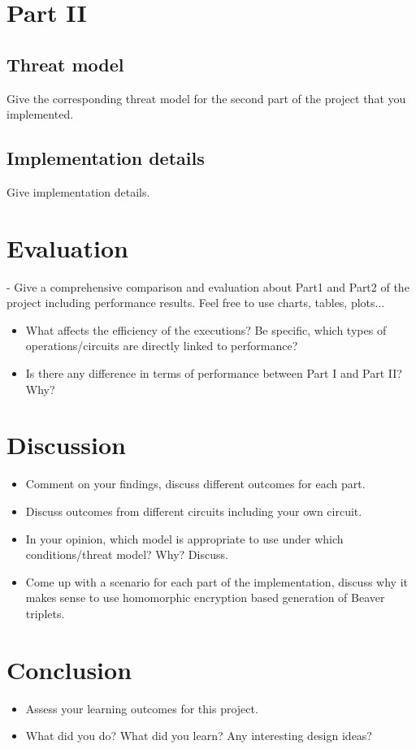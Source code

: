 \documentclass[10pt,conference,compsocconf]{IEEEtran}
\begin{document}
\section{Part II}
\subsection{Threat model}
Give the corresponding threat model for the second part of the project that you implemented. 
\subsection{Implementation details}
Give implementation details.
\section{Evaluation}
- Give a comprehensive comparison and evaluation about Part1 and Part2 of the project including performance results. Feel free to use charts, tables, plots...\\
\begin{itemize}
    \item What affects the efficiency of the executions? Be specific, which types of operations/circuits are directly linked to performance?
    \item Is there any difference in terms of performance between Part I and Part II? Why? 
\end{itemize}

\section{Discussion}
\begin{itemize}
    \item Comment on your findings, discuss different outcomes for each part.
    \item Discuss outcomes from different circuits including your own circuit.
    \item In your opinion, which model is appropriate to use under which conditions/threat model? Why? Discuss.
    \item Come up with a scenario for each part of the implementation, discuss why it makes sense to use homomorphic encryption based generation of Beaver triplets.
\end{itemize}

\section{Conclusion}
\begin{itemize}
    \item Assess your learning outcomes for this project.
    \item What did you do? What did you learn? Any interesting design ideas? 
\end{itemize}



\end{document}
